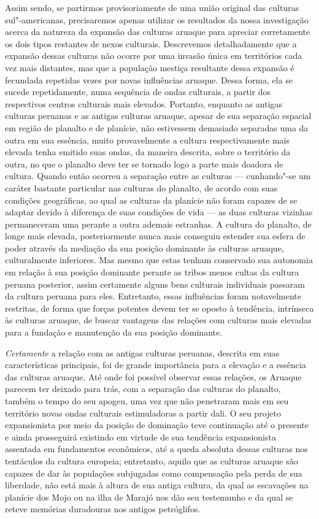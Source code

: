 Assim sendo, se partirmos provisoriamente de uma união original das
culturas sul"-americanas, precisaremos apenas utilizar os resultados
da nossa investigação acerca da natureza da expansão das culturas
aruaque para apreciar corretamente os dois tipos restantes de nexos
culturais. Descrevemos detalhadamente que a expansão dessas culturas não 
ocorre por uma invasão única em territórios cada vez mais
distantes, mas que a população mestiça resultante dessa expansão é
fecundada repetidas vezes por novas influências aruaque. Dessa forma, ela se
sucede repetidamente, numa sequência de ondas culturais, a partir dos
respectivos centros culturais mais elevados. Portanto, enquanto as
antigas culturas peruanas e as antigas culturas aruaque, apesar de sua
separação espacial em região de planalto e de planície, não estivessem
demasiado separadas uma da outra em sua essência, muito provavelmente a
cultura respectivamente mais elevada tenha emitido suas ondas, da maneira
descrita, sobre o território da outra, no que o planalto deve ter se
tornado logo a parte mais doadora de cultura. Quando então ocorreu a
separação entre as culturas --- cunhando"-se um caráter bastante
particular nas culturas do planalto, de acordo com suas condições
geográficas, ao qual as culturas da planície não foram capazes de se
adaptar devido à diferença de suas condições de vida --- as duas
culturas vizinhas permaneceram uma perante a outra ademais estranhas. A
cultura do planalto, de longe mais elevada, posteriormente nunca mais
conseguiu estender sua esfera de poder através da mediação da sua
posição dominante às culturas aruaque, culturalmente inferiores. Mas
mesmo que estas tenham conservado sua autonomia em relação à sua posição
dominante perante as tribos menos cultas da cultura peruana posterior,
assim certamente alguns bens culturais individuais passaram da cultura
peruana para eles. Entretanto, essas influências foram notavelmente
restritas, de forma que forças potentes devem ter se oposto à tendência,
intrínseca às culturas aruaque, de buscar vantagens das relações com
culturas mais elevadas para a fundação e manutenção da sua posição
dominante.

\textit{Certamente} a relação com as antigas culturas peruanas, descrita em suas
características principais, foi de grande importância para a elevação e
a essência das culturas aruaque. Até onde foi possível observar essas
relações, os Aruaque parecem ter deixado para trás, com a separação das
culturas do planalto, também o tempo do seu apogeu, uma vez que não
penetraram mais em seu território novas ondas culturais estimuladoras a
partir dali. O seu projeto expansionista por meio da posição de
dominação teve continuação até o presente e ainda prosseguirá existindo
em virtude de sua tendência expansionista assentada em fundamentos
econômicos, até a queda absoluta dessas culturas nos tentáculos da
cultura europeia; entretanto, aquilo que as culturas aruaque são capazes
de dar às populações subjugadas como compensação pela perda de sua
liberdade, não está mais à altura de sua antiga cultura, da qual as
escavações na planície dos Mojo ou na ilha de Marajó nos dão seu
testemunho e da qual se reteve memórias duradouras nos antigos
petróglifos.

